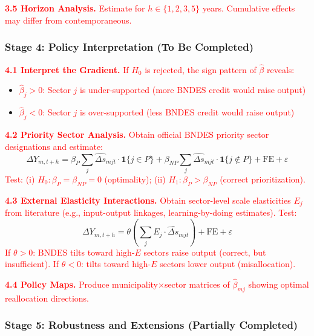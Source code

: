 \documentclass{article}
\begin{document}
\textcolor{red}{\textbf{3.5 Horizon Analysis.} Estimate for $h \in \{1, 2, 3, 5\}$ years. Cumulative effects may differ from contemporaneous.}

\subsubsection*{Stage 4: Policy Interpretation (To Be Completed)}

\textcolor{red}{\textbf{4.1 Interpret the Gradient.} If $H_0$ is rejected, the sign pattern of $\hat{\beta}$ reveals:}
\begin{itemize}
    \item \textcolor{red}{$\hat{\beta}_j > 0$: Sector $j$ is under-supported (more BNDES credit would raise output)}
    \item \textcolor{red}{$\hat{\beta}_j < 0$: Sector $j$ is over-supported (less BNDES credit would raise output)}
\end{itemize}

\textcolor{red}{\textbf{4.2 Priority Sector Analysis.} Obtain official BNDES priority sector designations and estimate:}
\begin{equation*}
    \Delta Y_{m,t+h} = \beta_P \sum_j \widehat{\Delta s}_{mjt} \cdot \mathbf{1}\{j \in P\} + \beta_{NP} \sum_j \widehat{\Delta s}_{mjt} \cdot \mathbf{1}\{j \notin P\} + \text{FE} + \varepsilon
\end{equation*}
\textcolor{red}{Test: (i) $H_0: \beta_P = \beta_{NP} = 0$ (optimality); (ii) $H_1: \beta_P > \beta_{NP}$ (correct prioritization).}

\textcolor{red}{\textbf{4.3 External Elasticity Interactions.} Obtain sector-level scale elasticities $E_j$ from literature (e.g., input-output linkages, learning-by-doing estimates). Test:}
\begin{equation*}
    \Delta Y_{m,t+h} = \theta \left( \sum_j E_j \cdot \widehat{\Delta s}_{mjt} \right) + \text{FE} + \varepsilon
\end{equation*}
\textcolor{red}{If $\theta > 0$: BNDES tilts toward high-$E$ sectors raise output (correct, but insufficient). If $\theta < 0$: tilts toward high-$E$ sectors lower output (misallocation).}

\textcolor{red}{\textbf{4.4 Policy Maps.} Produce municipality$\times$sector matrices of $\hat{\beta}_{mj}$ showing optimal reallocation directions.}

\subsubsection*{Stage 5: Robustness and Extensions (Partially Completed)}
\end{document}
